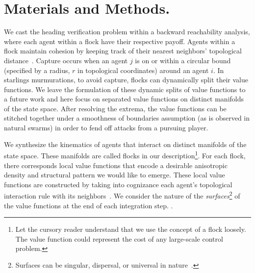 \section{Materials and Methods.}
\label{sec:methods}
%
We cast the heading verification problem within a backward reachability analysis, where each agent within a flock have their respective payoff. Agents within a flock maintain cohesion by keeping track of their nearest neighbors' topological distance~\cite{Ballerini1232}. Capture occurs when an agent $j$ is on or within a circular bound (specified by a radius, $r$ in topological coordinates) around an agent $i$.  
In starlings murmurations, to avoid capture, flocks can dynamically split their value functions. We leave the formulation of these dynamic splits of value functions to a future work and here focus on separated value functions on distinct manifolds of the state space. After resolving the extrema, the value functions can be stitched together under a smoothness of boundaries assumption (as is observed in natural swarms) in order to fend off attacks from a pursuing player. %

%
 We synthesize the kinematics of agents that interact on distinct manifolds of the state space. These manifolds are called flocks in our description\footnote{Let the cursory reader understand that we use the concept of a flock loosely. The value function could represent the cost of any large-scale control problem.}. For each flock, there corresponds local value functions that encode a desirable anisotropic density and structural pattern we would like to emerge.  These local value functions are constructed by  taking into cognizance each agent's topological interaction rule with its neighbors~\cite{Ballerini1232}. We consider the nature of the \textit{surfaces}\footnote{Surfaces can be  singular, dispersal, or universal in nature~\cite{Isaacs1965}.} of the value functions at the end of each integration step. .
 
